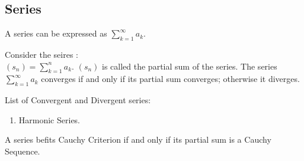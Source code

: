 \documentclass[../note.tex]{subfiles}
\begin{document}

\subsection{Series}
\begin{definition}[Series]
	A series can be expressed as $ \sum^{\infty}_{k=1} a_k$. 
\end{definition}
\begin{definition}
	Consider the seires :\\
	$(s_n)=\sum^{n}_{k=1} a_k$. $(s_n)$ is called the partial sum of the series. The series $\sum^{\infty}_{k=1}a_k $ converges if and only if its partial sum converges; otherwise it diverges. 
\end{definition}
\begin{example}
List of Convergent and Divergent series:
\begin{enumerate}
	\item Harmonic Series.
\end{enumerate}
\end{example}

\begin{definition}A series befits Cauchy Criterion if and only if its partial sum is a Cauchy Sequence. \end{definition}
\end{document}
